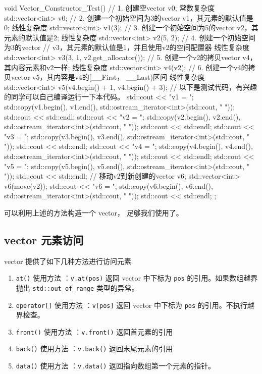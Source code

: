 \begin{cppcode}
void Vector_Constructor_Test() {
  // 1. 创建空vector v0;  常数复杂度
  std::vector<int> v0;
  // 2. 创建一个初始空间为3的vector v1，其元素的默认值是0; 线性复杂度
  std::vector<int> v1(3);
  // 3. 创建一个初始空间为5的vector v2，其元素的默认值是2; 线性复杂度
  std::vector<int> v2(5, 2);
  // 4. 创建一个初始空间为3的vector
  // v3，其元素的默认值是1，并且使用v2的空间配置器 线性复杂度
  std::vector<int> v3(3, 1, v2.get_allocator());
  // 5. 创建一个v2的拷贝vector v4， 其内容元素和v2一样; 线性复杂度
  std::vector<int> v4(v2);
  // 6. 创建一个v4的拷贝vector v5，其内容是v4的[__First， __Last)区间 线性复杂度
  std::vector<int> v5(v4.begin() + 1, v4.begin() + 3);
  // 以下是测试代码，有兴趣的同学可以自己编译运行一下本代码。
  std::cout << "v1 = ";
  std::copy(v1.begin(), v1.end(), std::ostream_iterator<int>(std::cout, " "));
  std::cout << std::endl;
  std::cout << "v2 = ";
  std::copy(v2.begin(), v2.end(), std::ostream_iterator<int>(std::cout, " "));
  std::cout << std::endl;
  std::cout << "v3 = ";
  std::copy(v3.begin(), v3.end(), std::ostream_iterator<int>(std::cout, " "));
  std::cout << std::endl;
  std::cout << "v4 = ";
  std::copy(v4.begin(), v4.end(), std::ostream_iterator<int>(std::cout, " "));
  std::cout << std::endl;
  std::cout << "v5 = ";
  std::copy(v5.begin(), v5.end(), std::ostream_iterator<int>(std::cout, " "));
  std::cout << std::endl;
  // 移动v2到新创建的vector v6;
  std::vector<int> v6(move(v2));
  std::cout << "v6 = ";
  std::copy(v6.begin(), v6.end(), std::ostream_iterator<int>(std::cout, " "));
  std::cout << std::endl;
};
\end{cppcode}

可以利用上述的方法构造一个 vector， 足够我们使用了。

\subsection{vector 元素访问}

vector 提供了如下几种方法进行访问元素

\begin{enumerate}
\item \texttt{at()}
使用方法 ：\texttt{v.at(pos)} 返回 vector 中下标为 \texttt{pos} 的引用。如果数组越界抛出 \texttt{std::out\_of\_range} 类型的异常。
\item \texttt{operator[]}
使用方法 ：\texttt{v[pos]} 返回 vector 中下标为 \texttt{pos} 的引用。不执行越界检查。
\item \texttt{front()}
使用方法 ：\texttt{v.front()} 返回首元素的引用
\item \texttt{back()}
使用方法 ：\texttt{v.back()} 返回末尾元素的引用
\item \texttt{data()}
使用方法 ：\texttt{v.data()} 返回指向数组第一个元素的指针。
\end{enumerate}

